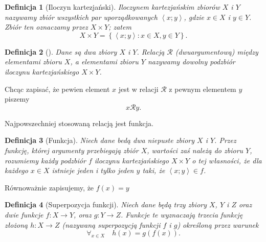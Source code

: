 \documentclass[12pt,a4paper]{report}
\newtheorem{definition}{Definicja}[chapter]
\newcommand{\parauporzadkowana}[2]{\left\langle {#1}; {#2} \right\rangle}
\newcommand{\zbior}[1]{\left\lbrace {#1} \right\rbrace }
\begin{document}
\begin{definition}[Iloczyn kartezjański{\citep[Sec 3.4]{kuratowski1966wstkep}}]
Iloczynem kartezjańskim zbiorów $X$ i $Y$ nazywamy zbiór wszystkich par uporządkowanych $\parauporzadkowana{x}{y}$, gdzie $x \in X$ i $y \in Y$. Zbiór ten oznaczamy przez $ X \times Y$; zatem
\begin{equation*}
X \times Y= \zbior{\parauporzadkowana{x}{y}:  x\in X  , y \in Y}.
\end{equation*} 

\end{definition}

\begin{definition}[{\citep[Sec 6.1 Def. 6.1]{kraszewski2007wstkep}}]
Dane są dwa zbiory $X$ i $Y$. Relacją $\mathcal{R}$ (dwuargumentową) między elementami zbioru $X$, a elementami zbioru $Y$ nazywamy dowolny podzbiór iloczynu kartezjańskiego $X \times Y$.
\end{definition}
Chcąc zapisać, że pewien element $x$ jest w relacji $\mathcal{R}$ z pewnym elementem $y$ piszemy
$$
x\mathcal{R}y.
$$

Najpowszechniej stosowaną relacją jest funkcja.

\begin{definition}[Funkcja{\citep[Sec 4.1]{kuratowski1966wstkep}}]
Niech dane bedą dwa niepuste zbiory $X$ i $Y$. Przez funkcję, której argumenty przebiegają zbiór $X$, wartości zaś należą do zbioru $Y$, rozumiemy każdy podzbiór $f$ iloczynu kartezjańskiego $X \times Y$ o tej własności, że dla każdego $x \in X$ istnieje jeden i tylko jeden $y$ taki, że $\parauporzadkowana{x}{y} \in f$. 

\end{definition}

Równoważnie zapisujemy, że $f(x)=y$

\begin{definition}[Superpozycja funkcji{\citep[Sec 4.2 Def. 1.]{kuratowski1966wstkep}}]
Niech dane będą trzy zbiory $X$, $Y$ i $Z$ oraz dwie funkcje $f:X\to Y$, oraz $g:Y\to Z$. Funkcje te wyznaczają trzecia funkcję złożoną $h:X\to Z$ (nazywaną superpozycją funkcji $f$ i $g$) określoną przez warunek
\begin{equation*}
\forall_{x \in X} \quad h(x)=g(f(x)).
\end{equation*}
\end{definition}
\end{document}
